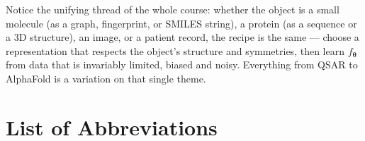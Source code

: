 \documentclass[11pt, oneside]{book}
\newcommand{\params}{\boldsymbol{\theta}}   %
\begin{document}
\begin{intbox}
Notice the unifying thread of the whole course: whether the object is a small
molecule (as a graph, fingerprint, or SMILES string), a protein (as a sequence or a
3D structure), an image, or a patient record, the recipe is the same --- choose a
representation that respects the object's structure and symmetries, then learn
$f_{\params}$ from data that is invariably limited, biased and noisy. Everything from
QSAR to AlphaFold is a variation on that single theme.
\end{intbox}



\chapter*{List of Abbreviations}
\vspace{-1.0 cm}

\end{document}
